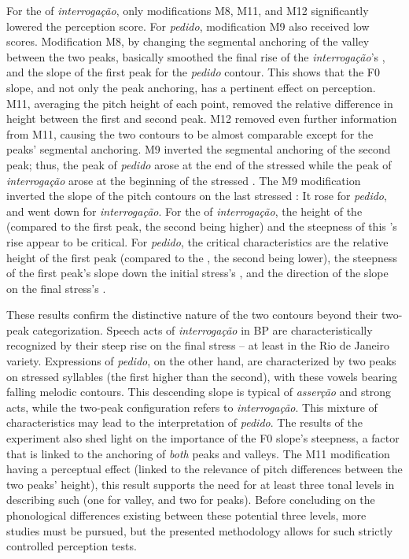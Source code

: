 \documentclass[output=paper]{LSP/langsci}
\begin{document}
For the  of \textit{interrogação}, only modifications M8, M11, and M12 significantly lowered the perception score. 
For \textit{pedido}, modification M9 also received low scores. 
Modification M8, by changing the segmental anchoring of the valley between the two peaks, basically smoothed the final rise of the \textit{interrogação}'s , and the slope of the first peak for the \textit{pedido} contour. 
This shows that the F0 slope, and not only the peak anchoring, has a pertinent effect on perception.
M11, averaging the pitch height of each point, removed the relative difference in height between the first and second peak. 
M12 removed even further information from M11, causing the two contours to be almost comparable except for the peaks' segmental anchoring. 
M9 inverted the segmental anchoring of the second peak; thus, the peak of \textit{pedido} arose at the end of the stressed  while the peak of \textit{interrogação} arose at the beginning of the stressed . 
The M9 modification inverted the slope of the pitch contours on the last stressed : It rose for \textit{pedido}, and went down for \textit{interrogação}. 
For the  of \textit{interrogação}, the height of the  (compared to the first peak, the second being higher) and the steepness of this 's rise appear to be critical. 
For \textit{pedido}, the critical characteristics are the relative height of the first peak (compared to the , the second being lower), the steepness of the first peak's slope down the initial stress's , and the direction of the slope on the final stress's . 

These results confirm the distinctive nature of the two contours beyond their two-peak categorization. 
Speech acts of \textit{interrogação} in BP are characteristically recognized by their steep rise on the final stress  -- at least in the Rio de Janeiro variety. 
Expressions of \textit{pedido}, on the other hand, are characterized by two peaks on stressed syllables (the first higher than the second), with these vowels bearing falling melodic contours. 
This descending slope is typical of \textit{asserção} and strong  acts, while the two-peak configuration refers to \textit{interrogação}.
This mixture of characteristics may lead to the interpretation of \textit{pedido}.
The results of the experiment also shed light on the importance of the F0 slope's steepness, a factor that is linked to the anchoring of \textit{both} peaks and valleys.
The M11 modification having a perceptual effect (linked to the relevance of pitch differences between the two peaks' height), this result supports the need for at least three tonal levels in describing such  (one for valley, and two for peaks).
Before concluding on the phonological differences existing between these potential three levels, more studies must be pursued, but the presented methodology allows for such strictly controlled perception tests.
\end{document}
